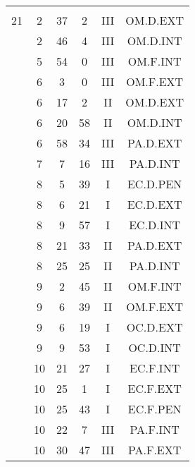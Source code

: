 \documentclass[12pt, a4paper]{article}
\begin{document}
\begin{multicols}{3}
{\begin{tabular}{c c c c c c}
	 	 	 	 & & & & & \\%
	 	 	 	21 & 2 & 37 & 2 & III & OM.D.EXT\\%
	 	 	 	 & 2 & 46 & 4 & III & OM.D.INT\\%
	 	 	 	 & 5 & 54 & 0 & III & OM.F.INT\\%
	 	 	 	 & 6 & 3 & 0 & III & OM.F.EXT\\%
	 	 	 	 & 6 & 17 & 2 & II & OM.D.EXT\\%
	 	 	 	 & 6 & 20 & 58 & II & OM.D.INT\\%
	 	 	 	 & 6 & 58 & 34 & III & PA.D.EXT\\%
	 	 	 	 & 7 & 7 & 16 & III & PA.D.INT\\%
	 	 	 	 & 8 & 5 & 39 & I & EC.D.PEN\\%
	 	 	 	 & 8 & 6 & 21 & I & EC.D.EXT\\%
	 	 	 	 & 8 & 9 & 57 & I & EC.D.INT\\%
	 	 	 	 & 8 & 21 & 33 & II & PA.D.EXT\\%
	 	 	 	 & 8 & 25 & 25 & II & PA.D.INT\\%
	 	 	 	 & 9 & 2 & 45 & II & OM.F.INT\\%
	 	 	 	 & 9 & 6 & 39 & II & OM.F.EXT\\%
	 	 	 	 & 9 & 6 & 19 & I & OC.D.EXT\\%
	 	 	 	 & 9 & 9 & 53 & I & OC.D.INT\\%
	 	 	 	 & 10 & 21 & 27 & I & EC.F.INT\\%
	 	 	 	 & 10 & 25 & 1 & I & EC.F.EXT\\%
	 	 	 	 & 10 & 25 & 43 & I & EC.F.PEN\\%
	 	 	 	 & 10 & 22 & 7 & III & PA.F.INT\\%
	 	 	 	 & 10 & 30 & 47 & III & PA.F.EXT\\%

\end{tabular}}
\end{multicols}
\end{document}
